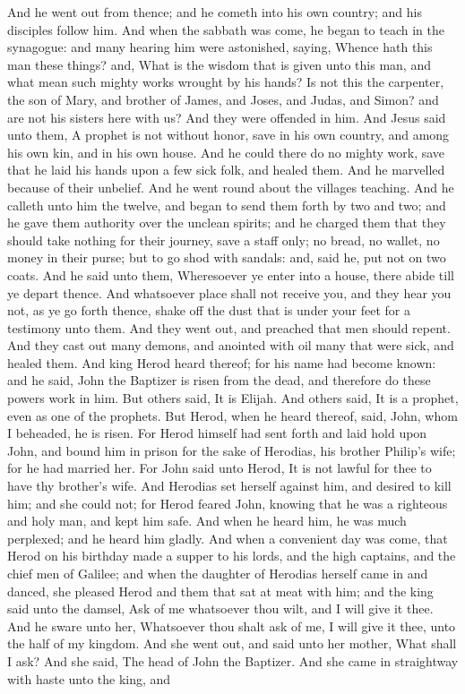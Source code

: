 And he went out from thence; and he cometh into his own country; and his disciples follow him. And when the sabbath was come, he began to teach in the synagogue: and many hearing him were astonished, saying, Whence hath this man these things? and, What is the wisdom that is given unto this man, and what mean such mighty works wrought by his hands? Is not this the carpenter, the son of Mary, and brother of James, and Joses, and Judas, and Simon? and are not his sisters here with us? And they were offended in him. And Jesus said unto them, A prophet is not without honor, save in his own country, and among his own kin, and in his own house. And he could there do no mighty work, save that he laid his hands upon a few sick folk, and healed them. And he marvelled because of their unbelief. And he went round about the villages teaching.  And he calleth unto him the twelve, and began to send them forth by two and two; and he gave them authority over the unclean spirits; and he charged them that they should take nothing for their journey, save a staff only; no bread, no wallet, no money in their purse; but to go shod with sandals: and, said he, put not on two coats. And he said unto them, Wheresoever ye enter into a house, there abide till ye depart thence. And whatsoever place shall not receive you, and they hear you not, as ye go forth thence, shake off the dust that is under your feet for a testimony unto them. And they went out, and preached that men should repent. And they cast out many demons, and anointed with oil many that were sick, and healed them.  And king Herod heard thereof; for his name had become known: and he said, John the Baptizer is risen from the dead, and therefore do these powers work in him. But others said, It is Elijah. And others said, It is a prophet, even as one of the prophets. But Herod, when he heard thereof, said, John, whom I beheaded, he is risen. For Herod himself had sent forth and laid hold upon John, and bound him in prison for the sake of Herodias, his brother Philip’s wife; for he had married her. For John said unto Herod, It is not lawful for thee to have thy brother’s wife. And Herodias set herself against him, and desired to kill him; and she could not; for Herod feared John, knowing that he was a righteous and holy man, and kept him safe. And when he heard him, he was much perplexed; and he heard him gladly. And when a convenient day was come, that Herod on his birthday made a supper to his lords, and the high captains, and the chief men of Galilee; and when the daughter of Herodias herself came in and danced, she pleased Herod and them that sat at meat with him; and the king said unto the damsel, Ask of me whatsoever thou wilt, and I will give it thee. And he sware unto her, Whatsoever thou shalt ask of me, I will give it thee, unto the half of my kingdom. And she went out, and said unto her mother, What shall I ask? And she said, The head of John the Baptizer. And she came in straightway with haste unto the king, and 